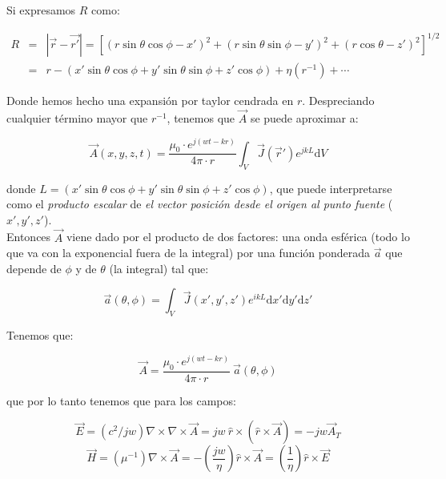 \documentclass[12pt,a4paper]{article}
\newcommand{\parentesis}[1]{\left( #1  \right)}
\newcommand{\D}{\mathrm{d}}
\newcommand{\rota}{\nabla \times}
\begin{document}
Si expresamos $R$ como:

$$ \begin{array}{lll} 
R & = & |\vec{r}-\vec{r'}| = [(r \sin \theta \cos \phi - x')^2 + (r \sin \theta \sin \phi - y')^2 + (r\cos\theta-z')^2]^{1/2}\\
 & = & r - (x' \sin \theta \cos \phi + y' \sin \theta \sin \phi + z' \cos \phi) + \eta(r^{-1}) + \cdots
\end{array}  $$

Donde hemos hecho una expansión por taylor cendrada en $r$. Despreciando cualquier término mayor que $r^{-1}$, tenemos que $\vec{A}$ se puede aproximar a:

\begin{equation}
\vec{A} (x,y,z,t) = \dfrac{\mu_0 \cdot e^{j(wt-kr)}}{4 \pi \cdot  r} \int_V \vec{J} (\vec{r}') e^{jkL} \D V
\end{equation} 

donde $L = (x' \sin \theta \cos \phi + y' \sin \theta \sin \phi + z' \cos \phi)$, que puede interpretarse como el \textit{producto escalar} de \textit{el vector posición desde el origen al punto fuente} ($x',y',z'$). \\
 
Entonces $\vec{A}$ viene dado por el producto de dos factores: una onda esférica (todo lo que va con la exponencial fuera de la integral) por una función ponderada $\vec{a}$ que depende de $\phi$ y de $\theta$  (la integral) tal que:

\begin{equation}
\vec{a} (\theta,\phi) = \int_V \vec{J} (x',y',z') e^{ikL} \D x' \D y' \D z'
\end{equation}

Tenemos que:

\begin{equation}
\vec{A} = \dfrac{\mu_0 \cdot e^{j(wt-kr)}}{4 \pi \cdot  r} \ \vec{a} (\theta,\phi)
\end{equation}

que por lo tanto tenemos que para los campos:

\begin{equation}
\vec{E} = (c^2/j w) \rota \rota \vec{A} = jw \ \hat{r} \times (\hat{r} \times \vec{A}) = - j w \vec{A}_T
\end{equation}
\begin{equation}
\vec{H} = (\mu^{-1}) \rota  \vec{A} = - \parentesis{\dfrac{jw}{\eta}} \hat{r} \times \vec{A} = \parentesis{\dfrac{1}{\eta}} \hat{r} \times \vec{E}
\end{equation}
\end{document}
